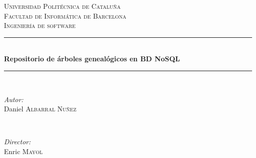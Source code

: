 \documentclass[13pt]{article}
\newcommand{\HRule}{\rule{\linewidth}{0.5mm}} %
\begin{document}
\begin{titlepage}

\center %
 

\textsc{\LARGE Universidad Politécnica de Cataluña}\\[1.5cm] %
\textsc{\Large Facultad de Informática de Barcelona}\\[0.5cm] %
\textsc{\large Ingeniería de software}\\[0.5cm] %


\HRule \\[0.4cm]
{ \huge \bfseries Repositorio de árboles genealógicos en BD NoSQL}\\[0.4cm] %
\HRule \\[1.5cm]
 

\begin{minipage}{0.4\textwidth}
\begin{flushleft} \large
\emph{Autor:}\\
Daniel \textsc{Albarral Nuñez} %
\end{flushleft}
\end{minipage}
~
\begin{minipage}{0.4\textwidth}
\begin{flushright} \large
\emph{Director:} \\
Enric \textsc{Mayol} %
\end{flushright}
\end{minipage}\\[4cm]



\end{titlepage}
\end{document}
